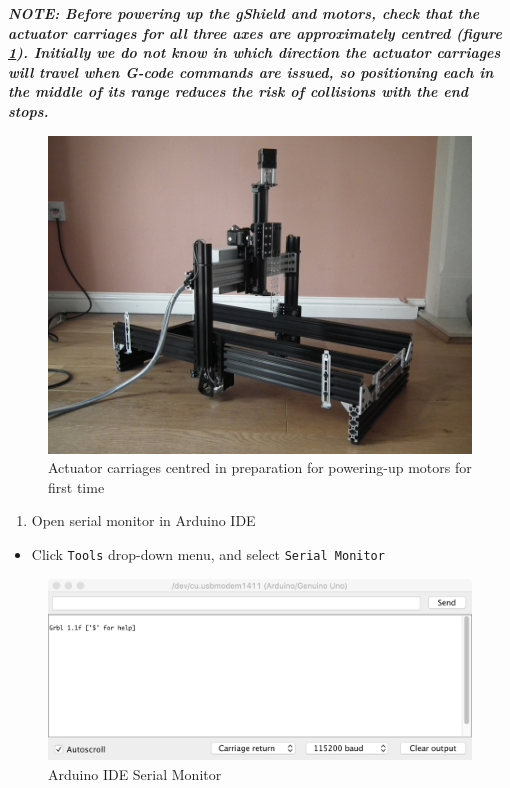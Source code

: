 \documentclass[
]{book}
\providecommand{\tightlist}{%
  \setlength{\itemsep}{0pt}\setlength{\parskip}{0pt}}
\begin{document}
\emph{\textbf{NOTE: Before powering up the gShield and motors, check that the actuator carriages for all three axes are approximately centred (figure \ref{fig:actuatorsCentred}). Initially we do not know in which direction the actuator carriages will travel when G-code commands are issued, so positioning each in the middle of its range reduces the risk of collisions with the end stops.}}

\begin{figure}

{\centering \includegraphics[width=0.75\linewidth]{images/actuator_carriages_centred} 

}

\caption{Actuator carriages centred in preparation for powering-up motors for first time}\label{fig:actuatorsCentred}
\end{figure}

\begin{enumerate}
\def\labelenumi{\arabic{enumi}.}
\tightlist
\item
  Open serial monitor in Arduino IDE
\end{enumerate}

\begin{itemize}
\tightlist
\item
  Click \texttt{Tools} drop-down menu, and select \texttt{Serial\ Monitor}
\end{itemize}

\begin{figure}

{\centering \includegraphics[width=0.75\linewidth]{images/Arduino_IDE_serial_monitor} 

}

\caption{Arduino IDE Serial Monitor}\label{fig:serialMonitor}
\end{figure}
\end{document}
